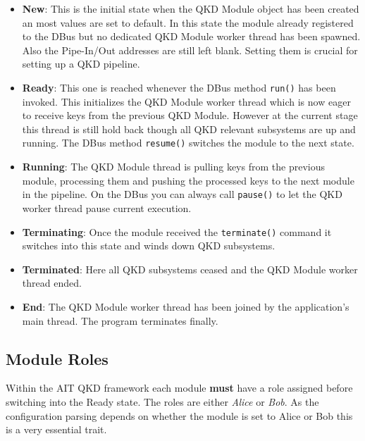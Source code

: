 \begin{itemize}

\item{\textbf{New}}: This is the initial state when the QKD Module object has been created an most values are set to default. In this state the module already registered to the DBus but no dedicated QKD Module worker thread has been spawned. \\[1em]
Also the Pipe-In/Out addresses are still left blank. Setting them is crucial for 
setting up a QKD pipeline.

\item{\textbf{Ready}}: This one is reached whenever the DBus method \texttt{run()} has been invoked. This initializes the QKD Module worker thread which is now eager to receive keys from the previous QKD Module. However at the current stage this thread is still hold back though all QKD relevant subsystems are up and running. The DBus method \texttt{resume()} switches the module to the next state.

\item{\textbf{Running}}: The QKD Module thread is pulling keys from the previous module, processing them and pushing the processed keys to the next module in the pipeline. On the DBus you can always call \texttt{pause()} to let the QKD worker thread pause current execution.

\item{\textbf{Terminating}}: Once the module received the \texttt{terminate()} command it switches into this state and winds down QKD subsystems.

\item{\textbf{Terminated}}: Here all QKD subsystems ceased and the QKD Module worker thread ended.

\item{\textbf{End}}: The QKD Module worker thread has been joined by the application's main thread. The program terminates finally.

\end{itemize}


\subsection{Module Roles}
\label{subsec:Module Roles}

Within the AIT QKD framework each module \textbf{must} have a role assigned before switching into the Ready state. The roles are either \emph{Alice} or \emph{Bob}. As the configuration parsing depends on whether the module is set to Alice or Bob this is a very essential trait.

